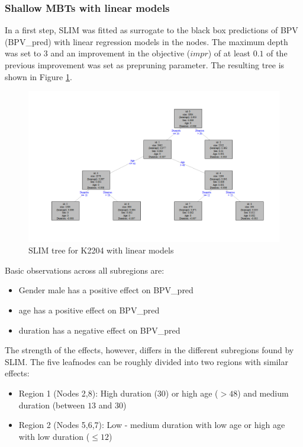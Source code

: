 \subsubsection{Shallow MBTs with linear models}
In a first step, SLIM was fitted as surrogate to the black box predictions of BPV (BPV\_pred) with linear regression models in the nodes. The maximum depth was set to 3 and an improvement in the objective ($impr$) of at least $0.1$ of the previous improvement was set as prepruning parameter.
 The resulting tree is shown in Figure \ref{fig:ins_slim_lm_tree}.

 \begin{figure}[!htb]
     \centering     
     \includegraphics[width = 14cm]{Figures/insurance_use_case/k2204_BPV/slim_lm_tree.png}
     \caption{SLIM tree for K2204 with linear models}
     \label{fig:ins_slim_lm_tree}
 \end{figure}

Basic observations across all subregions are:
\begin{itemize}
    \item Gender male has a positive effect on BPV\_pred
    \item age has a positive effect on BPV\_pred
    \item duration has a negative effect on BPV\_pred
\end{itemize}

The strength of the effects, however, differs in the different subregions found by SLIM.
The five leafnodes can be roughly divided into two regions with similar effects:
\begin{itemize}
    \item Region 1 (Nodes 2,8): High duration ($30$) or high age ($>48$) and medium duration (between $13$ and $30$)
    \item Region 2 (Nodes 5,6,7): Low - medium duration with low age or high age with low duration ($\leq 12$)
\end{itemize}

